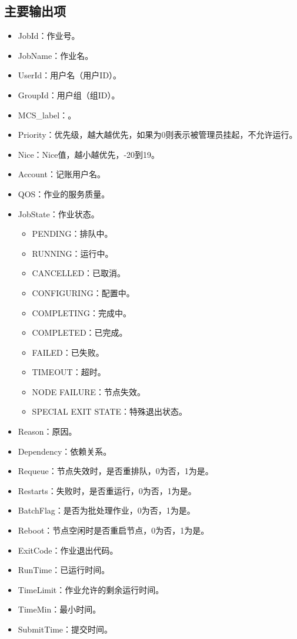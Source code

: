 \subsection{主要输出项}
\begin{itemize}
	\item JobId：作业号。
	\item JobName：作业名。
	\item UserId：用户名（用户ID）。
	\item GroupId：用户组（组ID）。
	\item MCS\_label：。
	\item Priority：优先级，越大越优先，如果为0则表示被管理员挂起，不允许运行。
	\item Nice：Nice值，越小越优先，-20到19。
	\item Account：记账用户名。
	\item QOS：作业的服务质量。
	\item JobState：作业状态。
\begin{itemize}
	\item PENDING：排队中。
	\item RUNNING：运行中。
	\item CANCELLED：已取消。
	\item CONFIGURING：配置中。
	\item COMPLETING：完成中。
	\item COMPLETED：已完成。
	\item FAILED：已失败。
	\item TIMEOUT：超时。
	\item NODE FAILURE：节点失效。
	\item SPECIAL EXIT STATE：特殊退出状态。
\end{itemize}
	\item Reason：原因。
	\item Dependency：依赖关系。
	\item Requeue：节点失效时，是否重排队，0为否，1为是。
	\item Restarts：失败时，是否重运行，0为否，1为是。
	\item BatchFlag：是否为批处理作业，0为否，1为是。
	\item Reboot：节点空闲时是否重启节点，0为否，1为是。
	\item ExitCode：作业退出代码。
	\item RunTime：已运行时间。
	\item TimeLimit：作业允许的剩余运行时间。
	\item TimeMin：最小时间。
	\item SubmitTime：提交时间。

\end{itemize}
